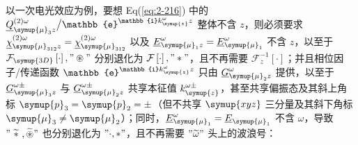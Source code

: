 以一次电光效应为例，要想 Eq(\ref{eq:2-216}) 中的 ${\underline{Q}}^{(2)\omega}_{{\symup{\mu}}_{3}z} \big/ \mathbb{e}^{\mathbb{i} k^\omega_{\symup{z}} z}$ 整体不含 $z$，则必须要求 ${\underline{\chi}}^{(2)\omega}_{ {\symup{\mu}}_{312}z} = {\underline{\chi}}^{(2)\omega}_{ {\symup{\mu}}_{312}}$ 以及 $\underline{E}^\omega_{{\symup{\mu}}_1 z} = \underline{E}^\omega_{{\symup{\mu}}_1}$ 不含 $z$，以至于 $\mathcal F_{\symup{3D}} \left[ \cdot \right], "\circledast"$ 分别退化为 $\mathcal F \left[ \cdot \right], "*"$，且不再需要 $\mathcal F^{-1}_z \left[ \cdot \right]$；并且相位因子/传递函数 $\mathbb{e}^{\mathbb{i} k^\omega_{\symup{z}} z}$ 只由 $\underline{G}^{\omega}_{{\symup{\mu}}_2 z}$ 提供，以至于 $\underline{G}^{\omega\pm}_{{\symup{\mu}}_3 z}$ 与 $\underline{G}^{\omega\pm}_{{\symup{\mu}}_2 z}$ 共享本征值 $k^{\omega\pm}_{\symup{z}}$，甚至共享偏振态及其斜上角标 ${\symup{p}}_{3} = {\symup{p}}_{2} = \pm$（但不共享 $\symup{xyz}$ 三分量及其斜下角标 ${\symup{\mu}}_{3} \neq {\symup{\mu}}_{2}$）；同时，$\underline{E}^\omega_{{\symup{\mu}}_1} = \underline{E}_{{\symup{\mu}}_1}$ 不含 $\omega$，导致 $"\ \widetilde *\ ,\widetilde \circledast"$ 也分别退化为 $"\cdot, *"$，且不再需要 $"\widetilde \omega"$ 头上的波浪号：
